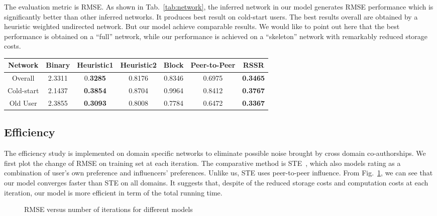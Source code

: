 \documentclass{ieeeaccess}
\begin{document}
The evaluation metric is RMSE. As shown in Tab.~\ref{tab:network}, the inferred network in our model generates RMSE performance which is significantly better than other inferred networks. It produces best result on cold-start users. The best results overall are obtained by a heuristic weighted undirected network. But our model achieve comparable results. We would like to point out here that the best  performance is obtained on a ``full'' network, while our performance is achieved on a ``skeleton'' network with remarkably reduced storage costs.

\begin{table*}[htbp]
\caption{Performance of graph based recommendation on social network}
\centering
\begin{tabular}{|c|c|c|c|c|c|c|}
\hline
Network &  Binary & Heuristic1 & Heuristic2 &	Block	& Peer-to-Peer	&RSSR \\\hline
Overall	&2.3311&	0.\textbf{3285}	&0.8176	&0.8346&	0.6975	&\textbf{0.3465}\\\hline
Cold-start	&2.1437	&\textbf{0.3854}	&0.8704	&0.9964	&0.8412&	\textbf{0.3767}\\\hline
Old User&2.3855	&\textbf{0.3093}	&0.8008	&0.7784	&0.6472	&\textbf{0.3367}\\\hline
\end{tabular}\label{tab:network}
\end{table*}


\subsection{Efficiency}
The efficiency study is implemented on domain specific networks to eliminate possible noise brought by cross domain co-authorships. We first plot the change of RMSE on training set at each iteration. The comparative method is STE~\cite{ma2009learning}, which also models rating as a combination of user's own preference and influencers' preferences. Unlike us, STE uses peer-to-peer influence. From Fig.~\ref{fig:iteration}, we can see that our model converges faster than STE on all domains. It suggests that, despite of the reduced storage costs and computation costs at each iteration, our model is more efficient in term of the total running time.

\begin{figure}[htbp]
\centering
{}
\end{figure}
\begin{figure}[htbp]
\centering
{}
\caption{RMSE versus number of iterations for different models}
\label{fig:iteration}
\end{figure}
\end{document}
